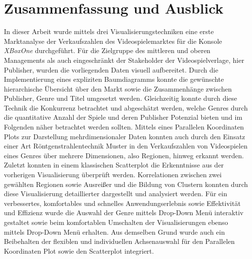 \documentclass[usegeometry=true]{scrartcl}
\begin{document}
\section{Zusammenfassung und Ausblick}
In dieser Arbeit wurde mittels drei Visualisierungstechniken eine erste Marktanalyse der Verkaufszahlen des Videospielemarktes für die Konsole \textit{XBoxOne} durchgeführt. 
Für die Zielgruppe des mittleren und oberen Managements als auch eingeschränkt der Stakeholder der Videospielverlage, hier Publisher, wurden die vorliegenden Daten visuell aufbereitet. 
Durch die Implementierung eines expliziten Baumdiagramms konnte die gewünschte hierarchische Übersicht über den Markt sowie die Zusammenhänge zwischen Publisher, Genre und Titel umgesetzt werden.
Gleichzeitig konnte durch diese Technik die Konkurrenz betrachtet und abgeschätzt werden, welche Genres durch die quantitative Anzahl der Spiele und deren Publisher Potenzial bieten und im Folgenden näher betrachtet werden sollten.
Mittels eines Parallelen Koordinaten Plots zur Darstellung mehrdimensionaler Daten konnten auch durch den Einsatz einer Art Röntgenstrahlentechnik Muster in den Verkaufszahlen von Videospielen eines Genres über mehrere Dimensionen, also Regionen, hinweg erkannt werden.
Zuletzt konnten in einem klassischen Scatterplot die Erkenntnisse aus der vorherigen Visualisierung überprüft werden. 
Korrelationen zwischen zwei gewählten Regionen sowie Ausreißer und die Bildung von Clustern konnten durch diese Visualisierung detaillierter dargestellt und analysiert werden.
Für ein verbessertes, komfortables und schnelles Anwendungserlebnis sowie Effektivität und Effizienz wurde die Auswahl der Genre mittels Drop-Down Menü interaktiv gestaltet sowie beim komfortablen Umschalten der Visualisierungen ebenso mittels Drop-Down Menü erhalten.
Aus demselben Grund wurde auch ein Beibehalten der flexiblen und individuellen Achsenauswahl für den Parallelen Koordinaten Plot sowie den Scatterplot integriert.
\end{document}
